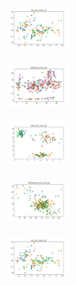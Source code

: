 \begin{figure}[H]    
    \centering
    \begin{subfigure}
        \centering
        \includegraphics[width=0.234\textwidth]{img/hs/iris_set_const_10_949004259_clust.png}
    \end{subfigure}
    \hfill
    \begin{subfigure}
        \centering
        \includegraphics[width=0.234\textwidth]{img/hs/ecoli_set_const_10_949004259_clust.png}
    \end{subfigure}
    \hfill
    \begin{subfigure}
        \centering
        \includegraphics[width=0.234\textwidth]{img/hs/rand_set_const_10_949004259_clust.png}
    \end{subfigure}
    \hfill
    \begin{subfigure}
        \centering
        \includegraphics[width=0.234\textwidth]{img/hs/newthyroid_set_const_10_949004259_clust.png}
    \end{subfigure}
    \hfill
    \begin{subfigure}
        \centering
        \includegraphics[width=0.234\textwidth]{img/hs/iris_set_const_10_589741062_clust.png}
    \end{subfigure}
    \hfill
    \begin{subfigure}

\end{subfigure}
\end{figure}
